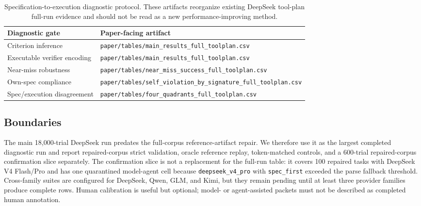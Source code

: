 \begin{table}[tbp]
\centering
\small
\begin{tabularx}{\linewidth}{lX}
\toprule
Diagnostic gate & Paper-facing artifact \\
\midrule
Criterion inference & \texttt{paper/tables/main\_results\_full\_toolplan.csv} \\
Executable verifier encoding & \texttt{paper/tables/main\_results\_full\_toolplan.csv} \\
Near-miss robustness & \texttt{paper/tables/near\_miss\_success\_full\_toolplan.csv} \\
Own-spec compliance & \texttt{paper/tables/self\_violation\_by\_signature\_full\_toolplan.csv} \\
Spec/execution disagreement & \texttt{paper/tables/four\_quadrants\_full\_toolplan.csv} \\
\bottomrule
\end{tabularx}
\caption{Specification-to-execution diagnostic protocol. These artifacts reorganize existing DeepSeek tool-plan full-run evidence and should not be read as a new performance-improving method.}
\end{table}

\subsection{Boundaries}

The main 18,000-trial DeepSeek run predates the full-corpus reference-artifact repair. We therefore use it as the largest completed diagnostic run and report repaired-corpus strict validation, oracle reference replay, token-matched controls, and a 600-trial repaired-corpus confirmation slice separately. The confirmation slice is not a replacement for the full-run table: it covers 100 repaired tasks with DeepSeek V4 Flash/Pro and has one quarantined model-agent cell because \texttt{deepseek\_v4\_pro} with \texttt{spec\_first} exceeded the parse fallback threshold. Cross-family suites are configured for DeepSeek, Qwen, GLM, and Kimi, but they remain pending until at least three provider families produce complete rows. Human calibration is useful but optional; model- or agent-assisted packets must not be described as completed human annotation.
